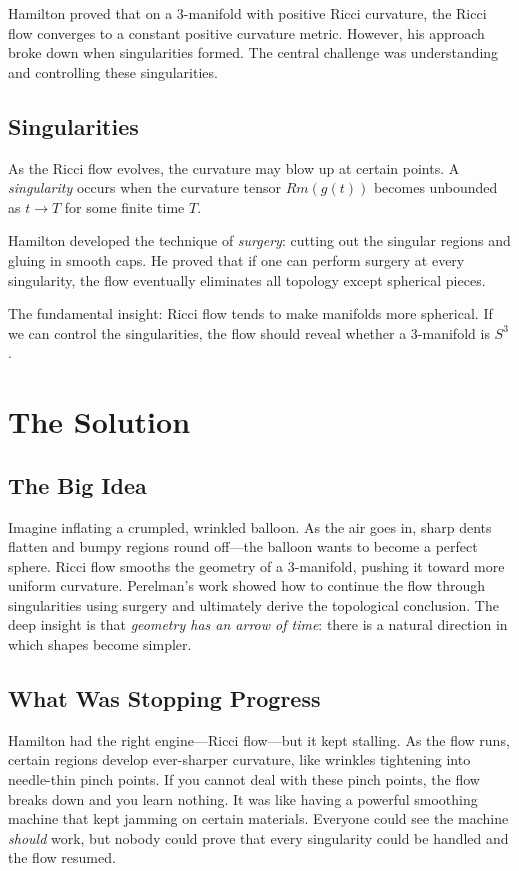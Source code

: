 Hamilton proved that on a 3-manifold with positive Ricci curvature, the Ricci flow converges to a constant positive curvature metric. However, his approach broke down when singularities formed. The central challenge was understanding and controlling these singularities.

\subsection{Singularities}

As the Ricci flow evolves, the curvature may blow up at certain points. A \emph{singularity} occurs when the curvature tensor $Rm(g(t))$ becomes unbounded as $t \to T$ for some finite time $T$.

Hamilton developed the technique of \emph{surgery}: cutting out the singular regions and gluing in smooth caps. He proved that if one can perform surgery at every singularity, the flow eventually eliminates all topology except spherical pieces.

\begin{highlightbox}
The fundamental insight: Ricci flow tends to make manifolds more spherical. If we can control the singularities, the flow should reveal whether a 3-manifold is $S^3$.
\end{highlightbox}

\section{The Solution}

\subsection{The Big Idea}
Imagine inflating a crumpled, wrinkled balloon. As the air goes in, sharp dents flatten and bumpy regions round off---the balloon wants to become a perfect sphere. Ricci flow smooths the geometry of a 3-manifold, pushing it toward more uniform curvature. Perelman's work showed how to continue the flow through singularities using surgery and ultimately derive the topological conclusion. The deep insight is that \emph{geometry has an arrow of time}: there is a natural direction in which shapes become simpler.

\subsection{What Was Stopping Progress}
Hamilton had the right engine---Ricci flow---but it kept stalling. As the flow runs, certain regions develop ever-sharper curvature, like wrinkles tightening into needle-thin pinch points. If you cannot deal with these pinch points, the flow breaks down and you learn nothing. It was like having a powerful smoothing machine that kept jamming on certain materials. Everyone could see the machine \emph{should} work, but nobody could prove that every singularity could be handled and the flow resumed.

